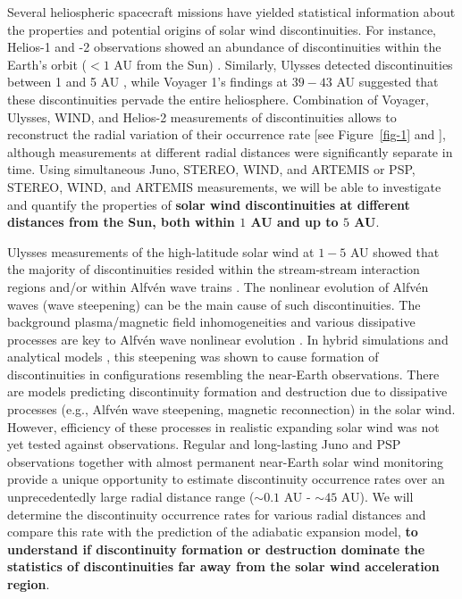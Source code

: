 \documentclass[
  letterpaper,
  DIV=11,
  numbers=noendperiod]{scrartcl}
\begin{document}
Several heliospheric spacecraft missions have yielded statistical
information about the properties and potential origins of solar wind
discontinuities. For instance, Helios-1 and -2 observations showed an
abundance of discontinuities within the Earth's orbit (\(<1\) AU from
the Sun) \citep{Mariani83}. Similarly, Ulysses detected discontinuities
between 1 and 5 AU \citep{tsurutaniNonlinearElectromagneticWaves1997},
while Voyager 1's findings at \(39-43\) AU \citep{Burlaga96,Burlaga11}
suggested that these discontinuities pervade the entire heliosphere.
Combination of Voyager, Ulysses, WIND, and Helios-2 measurements of
discontinuities allows to reconstruct the radial variation of their
occurrence rate {[}see Figure~\ref{fig-1} and
\citep{sodingRadialLatitudinalDependencies2001}{]}, although
measurements at different radial distances were significantly separate
in time. Using simultaneous Juno, STEREO, WIND, and ARTEMIS or PSP,
STEREO, WIND, and ARTEMIS measurements, we will be able to investigate
and quantify the properties of \textbf{solar wind discontinuities at
different distances from the Sun, both within \(1\) AU and up to \(5\)
AU}.

Ulysses measurements of the high-latitude solar wind at \(1-5\) AU
showed that the majority of discontinuities resided within the
stream-stream interaction regions and/or within Alfvén wave trains
\citep{Tsurutani95, Tsurutani&Ho99}. The nonlinear evolution of Alfvén
waves (wave steepening) can be the main cause of such discontinuities.
The background plasma/magnetic field inhomogeneities and various
dissipative processes are key to Alfvén wave nonlinear evolution
\citep{Lerche75, Prakash&Diamond99, Medvedev97:prl, Nariyuki14, Yang15}.
In hybrid simulations
\citep[see][]{Vasquez&Hollweg98, Vasquez&Hollweg01, TenBarge&Howes13}
and analytical models
\citep[e.g.,][]{Kennel88:jetp, Hada89, Malkov91, Wu&Kennel92, Medvedev97:pop},
this steepening was shown to cause formation of discontinuities in
configurations resembling the near-Earth observations. There are models
predicting discontinuity formation
\citep{Servidio15, Podesta&Roytershteyn17} and destruction
\citep{Servidio11,Matthaeus15} due to dissipative processes (e.g.,
Alfvén wave steepening, magnetic reconnection) in the solar wind.
However, efficiency of these processes in realistic expanding solar wind
was not yet tested against observations. Regular and long-lasting Juno
and PSP observations together with almost permanent near-Earth solar
wind monitoring provide a unique opportunity to estimate discontinuity
occurrence rates over an unprecedentedly large radial distance range
(\(\sim 0.1\) AU - \(\sim 45\) AU). We will determine the discontinuity
occurrence rates for various radial distances and compare this rate with
the prediction of the adiabatic expansion model, \textbf{to understand
if discontinuity formation or destruction dominate the statistics of
discontinuities far away from the solar wind acceleration region}.
\end{document}
